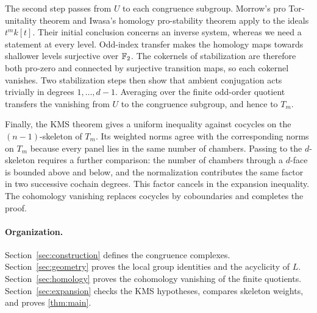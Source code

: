 The second step passes from $U$ to each congruence subgroup. Morrow's
pro Tor-unitality theorem \cite{Morrow} and Iwasa's homology pro-stability
theorem \cite{Iwasa} apply to the ideals $t^m k[t]$. Their initial
conclusion concerns an inverse system, whereas we need a statement at
every level. Odd-index transfer makes the homology maps towards
shallower levels surjective over $\mathbb F_2$. The cokernels of stabilization
are therefore both pro-zero and connected by surjective transition
maps, so each cokernel vanishes. Two stabilization steps then show that
ambient conjugation acts trivially in degrees $1,\ldots,d-1$.
Averaging over the finite odd-order quotient transfers the vanishing
from $U$ to the congruence subgroup, and hence to $T_m$.

Finally, the KMS theorem gives a uniform inequality against cocycles
on the $(n-1)$-skeleton of $T_m$. Its weighted norms agree with the
corresponding norms on $T_m$ because every panel lies in the same
number of chambers. Passing to the $d$-skeleton requires a further
comparison: the number of chambers through a $d$-face is bounded above
and below, and the normalization contributes the same factor in two
successive cochain degrees. This factor cancels in the expansion
inequality. The cohomology vanishing replaces cocycles by coboundaries
and completes the proof.

\paragraph{Organization.}
Section~\ref{sec:construction} defines the congruence complexes.
Section~\ref{sec:geometry} proves the local group identities and the
acyclicity of $L$. Section~\ref{sec:homology} proves the cohomology
vanishing of the finite quotients. Section~\ref{sec:expansion} checks
the KMS hypotheses, compares skeleton weights, and proves
\cref{thm:main}.
